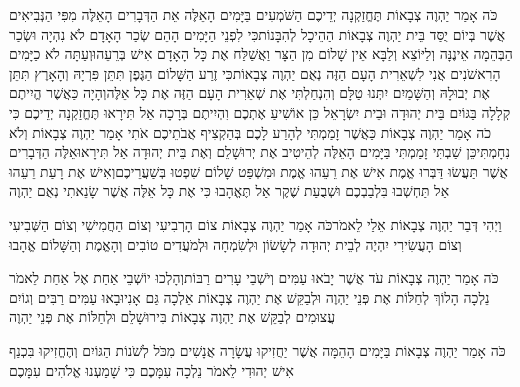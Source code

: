 \documentclass[../main/main.tex]{subfiles}
\begin{document}
\begin{multicols}{\ncols}
כֹּה אָמַר יַהְוֶה צְבָאוֹת תֶּחֱזַקְנָה יְדֵיכֶם הַשֹּׁמְעִים בַּיָּמִים הָאֵלֶּה אֵת הַדְּבָרִים הָאֵלֶּה מִפִּי הַנְּבִיאִים אֲשֶׁר בְּיוֹם יֻסַּד בֵּית יַהְוֶה צְבָאוֹת הַהֵיכָל לְהִבָּנוֹת\PreVerseSpace{}כִּי לִפְנֵי הַיָּמִים הָהֵם שְׂכַר הָאָדָם לֹא נִהְיָה וּשְׂכַר הַבְּהֵמָה אֵינֶנָּה וְלַיּוֹצֵא וְלַבָּא אֵין שָׁלוֹם מִן הַצָּר וַאֲשַׁלַּח אֶת כָּל הָאָדָם אִישׁ בְּרֵעֵהוּ\PreVerseSpace{}וְעַתָּה לֹא כַיָּמִים הָרִאשֹׁנִים אֲנִי לִשְׁאֵרִית הָעָם הַזֶּה נְאֻם יַהְוֶה צְבָאוֹת\PreVerseSpace{}כִּי זֶרַע הַשָּׁלוֹם הַגֶּפֶן תִּתֵּן פִּרְיָהּ וְהָאָרֶץ תִּתֵּן אֶת יְבוּלָהּ וְהַשָּׁמַיִם יִתְּנוּ טַלָּם וְהִנְחַלְתִּי אֶת שְׁאֵרִית הָעָם הַזֶּה אֶת כָּל אֵלֶּה\PreVerseSpace{}וְהָיָה כַּאֲשֶׁר הֱיִיתֶם קְלָלָה בַּגּוֹיִם בֵּית יְהוּדָה וּבֵית יִשְׂרָאֵל כֵּן אוֹשִׁיעַ אֶתְכֶם וִהְיִיתֶם בְּרָכָה אַל תִּירָאוּ תֶּחֱזַקְנָה יְדֵיכֶם \ClosedSection{}כִּי כֹה אָמַר יַהְוֶה צְבָאוֹת כַּאֲשֶׁר זָמַמְתִּי לְהָרַע לָכֶם בְּהַקְצִיף אֲבֹתֵיכֶם אֹתִי אָמַר יַהְוֶה צְבָאוֹת וְלֹא נִחָמְתִּי\PreVerseSpace{}כֵּן שַׁבְתִּי זָמַמְתִּי בַּיָּמִים הָאֵלֶּה לְהֵיטִיב אֶת יְרוּשָׁלֵם וְאֶת בֵּית יְהוּדָה אַל תִּירָאוּ\PreVerseSpace{}אֵלֶּה הַדְּבָרִים אֲשֶׁר תַּעֲשׂוּ דַּבְּרוּ אֱמֶת אִישׁ אֶת רֵעֵהוּ אֱמֶת וּמִשְׁפַּט שָׁלוֹם שִׁפְטוּ בְּשַׁעֲרֵיכֶם\PreVerseSpace{}וְאִישׁ אֶת רָעַת רֵעֵהוּ אַל תַּחְשְׁבוּ בִּלְבַבְכֶם וּשְׁבֻעַת שֶׁקֶר אַל תֶּאֱהָבוּ כִּי אֶת כָּל אֵלֶּה אֲשֶׁר שָׂנֵאתִי נְאֻם יַהְוֶה\OpenSection{}\par
{}וַיְהִי דְּבַר יַהְוֶה צְבָאוֹת אֵלַי לֵאמֹר\PreVerseSpace{}כֹּה אָמַר יַהְוֶה צְבָאוֹת צוֹם הָרְבִיעִי וְצוֹם הַחֲמִישִׁי וְצוֹם הַשְּׁבִיעִי וְצוֹם הָעֲשִׂירִי יִהְיֶה לְבֵית יְהוּדָה לְשָׂשׂוֹן וּלְשִׂמְחָה וּלְמֹעֲדִים טוֹבִים וְהָאֱמֶת וְהַשָּׁלוֹם אֱהָבוּ\OpenSection{}\par
{}כֹּה אָמַר יַהְוֶה צְבָאוֹת עֹד אֲשֶׁר יָבֹאוּ עַמִּים וְיֹשְׁבֵי עָרִים רַבּוֹת\PreVerseSpace{}וְהָלְכוּ יוֹשְׁבֵי אַחַת אֶל אַחַת לֵאמֹר נֵלְכָה הָלוֹךְ לְחַלּוֹת אֶת פְּנֵי יַהְוֶה וּלְבַקֵּשׁ אֶת יַהְוֶה צְבָאוֹת אֵלְכָה גַּם אָנִי\PreVerseSpace{}וּבָאוּ עַמִּים רַבִּים וְגוֹיִם עֲצוּמִים לְבַקֵּשׁ אֶת יַהְוֶה צְבָאוֹת בִּירוּשָׁלֵם וּלְחַלּוֹת אֶת פְּנֵי יַהְוֶה\OpenSection{}\par
{}כֹּה אָמַר יַהְוֶה צְבָאוֹת בַּיָּמִים הָהֵמָּה אֲשֶׁר יַחֲזִיקוּ עֲשָׂרָה אֲנָשִׁים מִכֹּל לְשֹׁנוֹת הַגּוֹיִם וְהֶחֱזִיקוּ בִּכְנַף אִישׁ יְהוּדִי לֵאמֹר נֵלְכָה עִמָּכֶם כִּי שָׁמַעְנוּ אֱלֹהִים עִמָּכֶם\OpenSection{}\par

\end{multicols}
\end{document}
